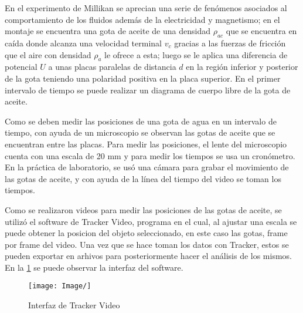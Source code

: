 En el experimento de Millikan se aprecian una serie de fenómenos asociados al 
comportamiento de los fluidos además de la electricidad y magnetismo; en el 
montaje se encuentra una gota de aceite de una densidad $\rho_{ac}$ que se 
encuentra en caída donde alcanza una velocidad terminal $v_c$ gracias a las 
fuerzas de fricción que el aire con densidad $\rho_a$ le ofrece a esta; luego 
se le aplica una diferencia de potencial $U$ a unas placas paralelas de 
distancia $d$ en la región inferior y posterior de la gota teniendo una 
polaridad positiva en la placa superior. En el primer intervalo de tiempo se 
puede realizar un diagrama de cuerpo libre de la gota de aceite.



Como se deben medir las posiciones de una gota de agua en un intervalo de 
tiempo, con ayuda de un microscopio se observan las gotas de aceite que se 
encuentran entre las placas. Para medir las posiciones, el lente del
microscopio cuenta con una escala de 20 mm y para medir los tiempos se usa un
cronómetro. En la práctica de laboratorio, se usó una cámara para grabar el 
movimiento de las gotas de aceite, y con ayuda de la línea del tiempo del video
se toman los tiempos.



Como se realizaron videos para medir las posiciones de las gotas de aceite, se 
utilizó el software de Tracker Video, programa en el cual, al ajustar una
escala se puede obtener la posicion del objeto seleccionado, en este caso las 
gotas, frame por frame del video. Una vez que se hace toman los datos con 
Tracker, estos se pueden exportar en arhivos para posteriormente hacer el 
análisis de los mismos. En la \cref{fig:Tracker} se puede observar la interfaz
del software.

\begin{figure}[H]
    \centering
    \texttt{[image: Image/]}
    \caption{Interfaz de Tracker Video}
    \label{fig:Tracker}
\end{figure}
